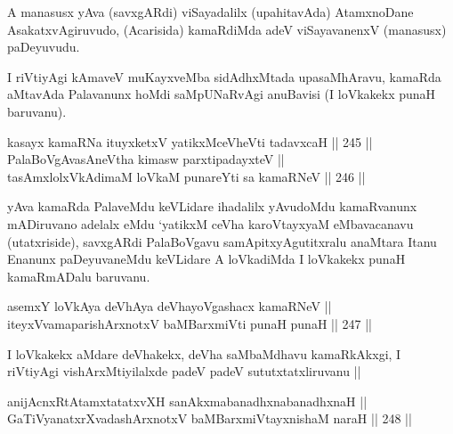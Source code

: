 \begin{artha}
A manasusx yAva (savxgARdi) viSayadalilx (upahitavAda) AtamxnoDane
AsakatxvAgiruvudo, (Acarisida) kamaRdiMda adeV viSayavanenxV (manasusx)
paDeyuvudu.
\end{artha}


\begin{artha}
I riVtiyAgi kAmaveV muKayxveMba sidAdhxMtada upasaMhAravu, kamaRda
aMtavAda Palavanunx hoMdi saMpUNaRvAgi anuBavisi (I loVkakekx punaH
baruvanu).
\end{artha}


\begin{shl}
kasayx kamaRNa ituyxketxV yatikxMceVheVti tadavxcaH \hfill || 245 ||  \\
PalaBoVgAvasAneV\s tha kimasw parxtipadayxteV || \\
tasAmxlolxVkAdimaM loVkaM punareYti sa kamaRNeV \hfill || 246 ||  
\end{shl}

\begin{artha}
yAva kamaRda PalaveMdu keVLidare ihadalilx yAvudoMdu kamaRvanunx
mADiruvano adelalx eMdu `yatikxM ceVha karoVtayxyaM eMbavacanavu
(utatxriside), savxgARdi PalaBoVgavu samApitxyAgutitxralu anaMtara
Itanu Enanunx paDeyuvaneMdu keVLidare A loVkadiMda I loVkakekx punaH
kamaRmADalu baruvanu.
\end{artha}


\begin{shl}
asemxY loVkAya deVhAya deVhayoVgashacx kamaRNeV || \\
iteyxVvamaparishArxnotxV baMBarxmiVti punaH punaH \hfill || 247 ||  
\end{shl}

\begin{artha}
I loVkakekx aMdare deVhakekx, deVha saMbaMdhavu kamaRkAkxgi, I
riVtiyAgi vishArxMtiyilalxde padeV padeV sututxtatxliruvanu || 
\end{artha}


\begin{shl}
anijAcnxRtAtamxtatatxvXH sanAkxmabanadhxnabanadhxnaH || \\
GaTiVyanatxrXvadashArxnotxV baMBarxmiVtayxnishaM naraH \hfill || 248 ||  
\end{shl}

